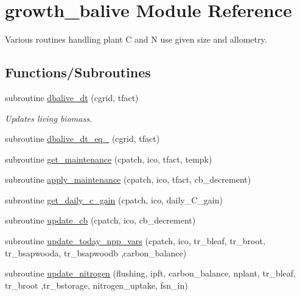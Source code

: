 \hypertarget{namespacegrowth__balive}{}\section{growth\+\_\+balive Module Reference}
\label{namespacegrowth__balive}


Various routines handling plant C and N use given size and allometry.  


\subsection*{Functions/\+Subroutines}
\begin{DoxyCompactItemize}
\item 
subroutine \hyperlink{namespacegrowth__balive_a7781ae229b2399c90d50858382665ee8}{dbalive\+\_\+dt} (cgrid, tfact)
\begin{DoxyCompactList}\small\item\em Updates living biomass. \end{DoxyCompactList}\item 
subroutine \hyperlink{namespacegrowth__balive_a15cba39e9b70b8dd6a1e2d0cbdd5cc2e}{dbalive\+\_\+dt\+\_\+eq\+\_} (cgrid, tfact)
\item 
subroutine \hyperlink{namespacegrowth__balive_ac2f667372e6f2a5fc7329466cc958a6c}{get\+\_\+maintenance} (cpatch, ico, tfact, tempk)
\item 
subroutine \hyperlink{namespacegrowth__balive_a692030d19fe1844dd9d9b676a9475e64}{apply\+\_\+maintenance} (cpatch, ico, tfact, cb\+\_\+decrement)
\item 
subroutine \hyperlink{namespacegrowth__balive_ad43c7e3fcb88db17077ed58aeab8fe2d}{get\+\_\+daily\+\_\+c\+\_\+gain} (cpatch, ico, daily\+\_\+\+C\+\_\+gain)
\item 
subroutine \hyperlink{namespacegrowth__balive_ac4ca7901eed6321044f171f6f1b8d7d6}{update\+\_\+cb} (cpatch, ico, cb\+\_\+decrement)
\item 
subroutine \hyperlink{namespacegrowth__balive_a2bc138f187a465304da86a27fb804f45}{update\+\_\+today\+\_\+npp\+\_\+vars} (cpatch, ico, tr\+\_\+bleaf, tr\+\_\+broot, tr\+\_\+bsapwooda, tr\+\_\+bsapwoodb                                                                                                                                       ,carbon\+\_\+balance)
\item 
subroutine \hyperlink{namespacegrowth__balive_a555ad92da5ad088f7161ea46d6ec8152}{update\+\_\+nitrogen} (flushing, ipft, carbon\+\_\+balance, nplant, tr\+\_\+bleaf, tr\+\_\+broot                                                                                                                                               ,tr\+\_\+bstorage, nitrogen\+\_\+uptake, fsn\+\_\+in)

\end{DoxyCompactItemize}
